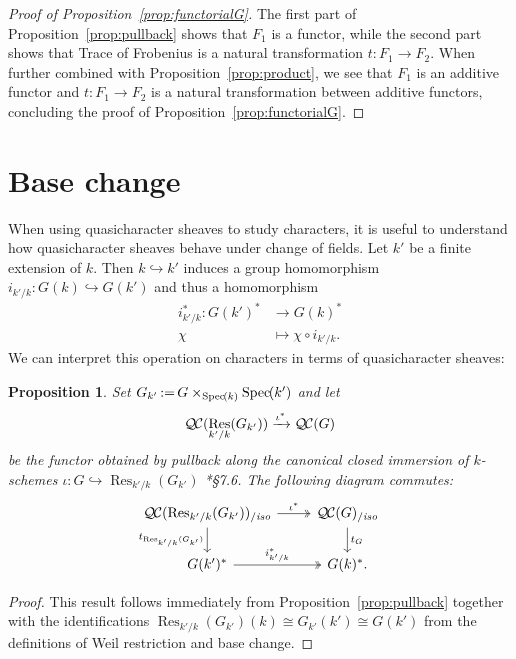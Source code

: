 \documentclass[11pt]{amsart}
\theoremstyle{plain}
\newtheorem{proposition}[theorem]{Proposition}
\theoremstyle{definition}
\theoremstyle{remark}
\newcommand{\Spec}[1]{{\operatorname{Spec}\hskip-1pt( #1 )}}
\DeclareMathOperator{\Res}{Res}
\newcommand{\ceq}{{\, :=\, }}
\newcommand{\QC}{{\mathcal{Q\hskip-0.8pt C}}}
\newcommand{\QCiso}[1]{\QC(#1)_{/\textit{iso}}}
\newcommand{\trFrob}[1]{t_{#1}}
\begin{document}
\begin{proof}[Proof of Proposition~\ref{prop:functorialG}]
The first part of Proposition~\ref{prop:pullback} shows that $F_1$ is a functor,
while the second part shows that Trace of Frobenius is a natural transformation
$t: F_1 \to F_2$. When further combined with Proposition~\ref{prop:product},
we see that $F_1$ is an additive functor and $t: F_1 \to F_2$ is a natural
transformation between additive functors, 
concluding the proof of Proposition~\ref{prop:functorialG}.
\end{proof}

\section{Base change}\label{sec:basechange}

When using quasicharacter sheaves to study characters, it is useful to understand
how quasicharacter sheaves behave under change of fields.
Let $k'$ be a finite extension of $k$. Then $k \hookrightarrow k'$ induces a group homomorphism
$i_{k'/k} : G(k) \hookrightarrow G(k')$ and thus a homomorphism
\begin{align*}
i_{k'/k}^* : G(k')^* &\to G(k)^* \\
\chi &\mapsto \chi\circ i_{k'/k}.
\end{align*}
We can interpret this operation on characters in terms of quasicharacter sheaves:
%

\begin{proposition} \label{prop:csbe}
Set $G_{k'} \ceq G\times_\Spec{k} \Spec{k'}$ and let
\[
\QC(\Res_{k'/k}(G_{k'})) \xrightarrow{\iota^*} \QC(G)
\]
be the functor obtained by pullback along the canonical closed immersion of $k$-schemes
$\iota : G \hookrightarrow \Res_{k'/k}(G_{k'})$
\cite{bosch-lutkebohmert-reynaud:NeronModels}*{\S 7.6}. 
The following diagram commutes:
\[
\begin{tikzcd}
\QCiso{\Res_{k'/k}(G_{k'})} \arrow[two heads]{r}{\iota^*} \dar[swap]{\trFrob{\Res_{k'/k}(G_{k'})}} & \QCiso{G} \dar{\trFrob{G}} \\
G(k')^* \arrow[two heads]{r}{i_{k'/k}^*} & G(k)^*.
\end{tikzcd}
\]
\end{proposition}
\begin{proof}
This result follows immediately from Proposition~\ref{prop:pullback} together with the identifications
$\Res_{k'/k}(G_{k'})(k) \cong G_{k'}(k') \cong G(k')$ from the definitions of Weil restriction and base change.
\end{proof}
\end{document}

